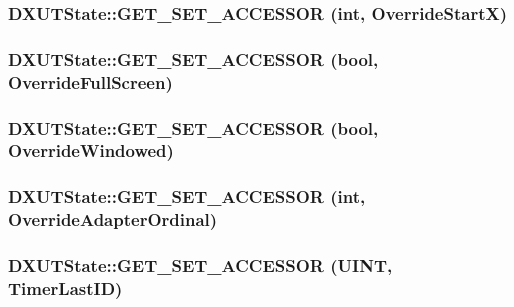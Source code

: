 \label{class_d_x_u_t_state_ad98c1abb28d4379b55f0f4ffb3191f29}
\hypertarget{class_d_x_u_t_state_a2f73719a7d7f24a4225b3e52a37ede27}{
\subsubsection[{GET\_\-SET\_\-ACCESSOR}]{\setlength{\rightskip}{0pt plus 5cm}DXUTState::GET\_\-SET\_\-ACCESSOR ({\bf int}, \/  OverrideStartX)}}
\label{class_d_x_u_t_state_a2f73719a7d7f24a4225b3e52a37ede27}
\hypertarget{class_d_x_u_t_state_a52534b577cfed421132eb0dadd278204}{
\subsubsection[{GET\_\-SET\_\-ACCESSOR}]{\setlength{\rightskip}{0pt plus 5cm}DXUTState::GET\_\-SET\_\-ACCESSOR (bool, \/  OverrideFullScreen)}}
\label{class_d_x_u_t_state_a52534b577cfed421132eb0dadd278204}
\hypertarget{class_d_x_u_t_state_aeca780e3adb83245c49adbe25fc9890d}{
\subsubsection[{GET\_\-SET\_\-ACCESSOR}]{\setlength{\rightskip}{0pt plus 5cm}DXUTState::GET\_\-SET\_\-ACCESSOR (bool, \/  OverrideWindowed)}}
\label{class_d_x_u_t_state_aeca780e3adb83245c49adbe25fc9890d}
\hypertarget{class_d_x_u_t_state_a7cbe2c1ea6f043e22f885897980ec6d5}{
\subsubsection[{GET\_\-SET\_\-ACCESSOR}]{\setlength{\rightskip}{0pt plus 5cm}DXUTState::GET\_\-SET\_\-ACCESSOR ({\bf int}, \/  OverrideAdapterOrdinal)}}
\label{class_d_x_u_t_state_a7cbe2c1ea6f043e22f885897980ec6d5}
\hypertarget{class_d_x_u_t_state_a6922427e890b6e63324c96a19df3858e}{
\subsubsection[{GET\_\-SET\_\-ACCESSOR}]{\setlength{\rightskip}{0pt plus 5cm}DXUTState::GET\_\-SET\_\-ACCESSOR (UINT, \/  TimerLastID)}}
